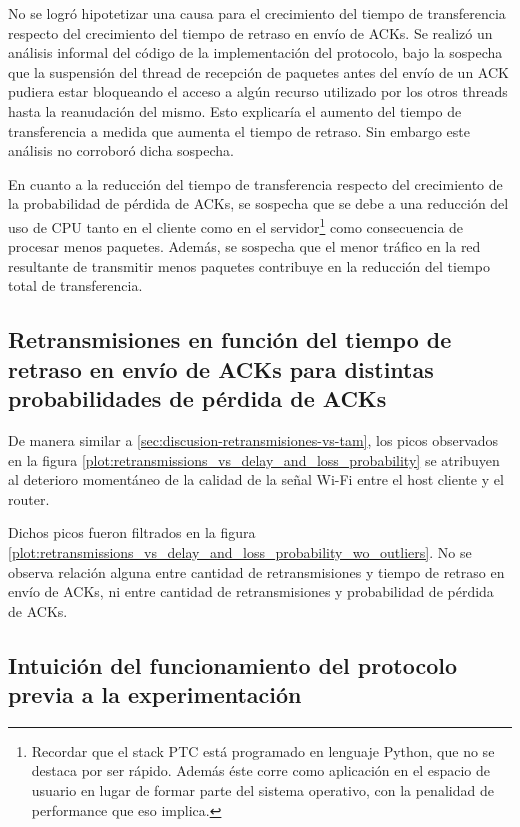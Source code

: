\documentclass[a4paper, 10pt, twoside]{article}
\begin{document}
No se logró hipotetizar una causa para el crecimiento del tiempo de transferencia respecto del crecimiento del tiempo de retraso en envío de ACKs. Se realizó un análisis informal del código de la implementación del protocolo, bajo la sospecha que la suspensión del thread de recepción de paquetes antes del envío de un ACK pudiera estar bloqueando el acceso a algún recurso utilizado por los otros threads hasta la reanudación del mismo. Esto explicaría el aumento del tiempo de transferencia a medida que aumenta el tiempo de retraso. Sin embargo este análisis no corroboró dicha sospecha.

En cuanto a la reducción del tiempo de transferencia respecto del crecimiento de la probabilidad de pérdida de ACKs, se sospecha que se debe a una reducción del uso de CPU tanto en el cliente como en el servidor\footnote{Recordar que el stack PTC está programado en lenguaje Python, que no se destaca por ser rápido. Además éste corre como aplicación en el espacio de usuario en lugar de formar parte del sistema operativo, con la penalidad de performance que eso implica.} como consecuencia de procesar menos paquetes. Además, se sospecha que el menor tráfico en la red resultante de transmitir menos paquetes contribuye en la reducción del tiempo total de transferencia.


\subsection{Retransmisiones en función del tiempo de retraso en envío de ACKs para distintas probabilidades de pérdida de ACKs}

De manera similar a \ref{sec:discusion-retransmisiones-vs-tam}, los picos observados en la figura \ref{plot:retransmissions_vs_delay_and_loss_probability} se atribuyen al deterioro momentáneo de la calidad de la señal Wi-Fi entre el host cliente y el router.

Dichos picos fueron filtrados en la figura \ref{plot:retransmissions_vs_delay_and_loss_probability_wo_outliers}. No se observa relación alguna entre cantidad de retransmisiones y tiempo de retraso en envío de ACKs, ni entre cantidad de retransmisiones y probabilidad de pérdida de ACKs.


\subsection{Intuición del funcionamiento del protocolo previa a la experimentación}
\label{sec:discusion-intuicion}
\end{document}

